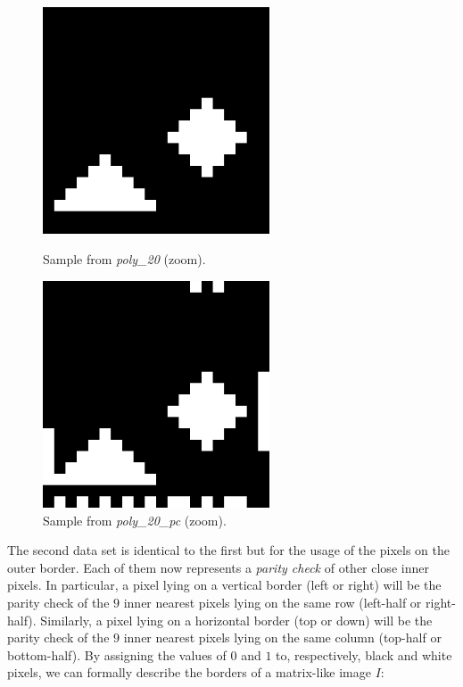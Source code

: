 \begin{figure}
    \centering
    \begin{minipage}{0.45\textwidth}
        \centering
        \includegraphics[width=0.6\textwidth]{poly20_zoom}
        \caption{Sample from \textit{poly\_20} (zoom).}
    \end{minipage}
    \hfil
    \begin{minipage}{0.45\textwidth}
        \centering
        \includegraphics[width=0.6\textwidth]{poly20_pc_zoom}
        \caption{Sample from \textit{poly\_20\_pc} (zoom).}
    \end{minipage}
\end{figure}

The second data set is identical to the first but for the usage of the pixels on the outer border. Each of them now represents a \textit{parity check} of other close inner pixels. In particular, a pixel lying on a vertical border (left or right) will be the parity check of the $9$ inner nearest pixels lying on the same row (left-half or right-half). Similarly, a pixel lying on a horizontal border (top or down) will be the parity check of the $9$ inner nearest pixels lying on the same column (top-half or bottom-half). By assigning the values of $0$ and $1$ to, respectively, black and white pixels, we can formally describe the borders of a matrix-like image $I$:


